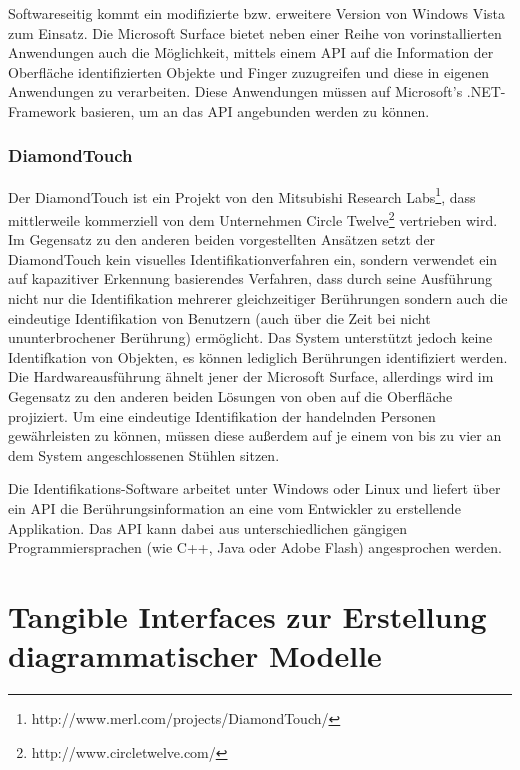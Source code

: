 Softwareseitig kommt ein modifizierte bzw. erweitere Version von Windows Vista zum Einsatz. Die Microsoft Surface bietet neben einer Reihe von vorinstallierten Anwendungen auch die Möglichkeit, mittels einem \gls{API} auf die Information der Oberfläche identifizierten Objekte und Finger zuzugreifen und diese in eigenen Anwendungen zu verarbeiten. Diese Anwendungen müssen auf Microsoft's .NET-Framework basieren, um an das \gls{API} angebunden werden zu können. 


\subsubsection{DiamondTouch} %
\label{ssub:diamond_touch}

Der DiamondTouch \citep{Dietz01} ist ein Projekt von den Mitsubishi Research Labs\footnote{http://www.merl.com/projects/DiamondTouch/}, dass mittlerweile kommerziell von dem Unternehmen Circle Twelve\footnote{http://www.circletwelve.com/} vertrieben wird. Im Gegensatz zu den anderen beiden vorgestellten Ansätzen setzt der DiamondTouch kein visuelles Identifikationverfahren ein, sondern verwendet ein auf kapazitiver Erkennung basierendes Verfahren, dass durch seine Ausführung nicht nur die Identifikation mehrerer gleichzeitiger Berührungen sondern auch die eindeutige Identifikation von Benutzern (auch über die Zeit bei nicht ununterbrochener Berührung) ermöglicht. Das System unterstützt jedoch keine Identifkation von Objekten, es können lediglich Berührungen identifiziert werden. Die Hardwareausführung ähnelt jener der Microsoft Surface, allerdings wird im Gegensatz zu den anderen beiden Lösungen von oben auf die Oberfläche projiziert. Um eine eindeutige Identifikation der handelnden Personen gewährleisten zu können, müssen diese außerdem auf je einem von bis zu vier an dem System angeschlossenen Stühlen sitzen.

Die Identifikations-Software arbeitet unter Windows oder Linux und liefert über ein \gls{API} die Berührungsinformation an eine vom Entwickler zu erstellende Applikation. Das \gls{API} kann dabei aus unterschiedlichen gängigen Programmiersprachen (wie C++, Java oder Adobe Flash) angesprochen werden.


\section{Tangible Interfaces zur Erstellung diagrammatischer Modelle} %
\label{sub:tangible_interfaces_zur_modellbildung}

